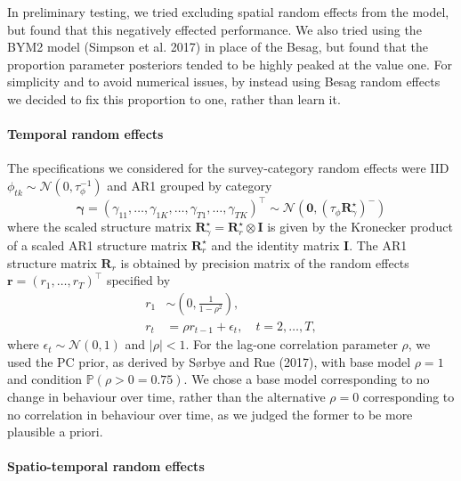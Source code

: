 \documentclass[
]{article}
\begin{document}
In preliminary testing, we tried excluding spatial random effects from
the model, but found that this negatively effected performance. We also
tried using the BYM2 model (Simpson et al. 2017) in place of the Besag,
but found that the proportion parameter posteriors tended to be highly
peaked at the value one. For simplicity and to avoid numerical issues,
by instead using Besag random effects we decided to fix this proportion
to one, rather than learn it.

\hypertarget{temporal-random-effects}{%
\paragraph{\texorpdfstring{Temporal random effects
\label{sec:temporal-random-effects}}{Temporal random effects }}\label{temporal-random-effects}}

The specifications we considered for the survey-category random effects
were IID \(\phi_{tk} \sim \mathcal{N}(0, \tau_\phi^{-1})\) and AR1
grouped by category \[
\bm{\gamma} = (\gamma_{11}, \ldots, \gamma_{1K}, \ldots, \gamma_{T1}, \ldots, \gamma_{TK})^\top \sim \mathcal{N}(\mathbf{0}, (\tau_\phi \mathbf{R}^\star_\gamma)^{-})
\] where the scaled structure matrix
\(\mathbf{R}^\star_\gamma = \mathbf{R}^\star_r \otimes \mathbf{I}\) is
given by the Kronecker product of a scaled AR1 structure matrix
\(\mathbf{R}^\star_r\) and the identity matrix \(\mathbf{I}\). The AR1
structure matrix \(\mathbf{R}_r\) is obtained by precision matrix of the
random effects \(\mathbf{r} = (r_1, \ldots, r_T)^\top\) specified by
\begin{align}
r_1 &\sim \left( 0, \frac{1}{1 - \rho^2} \right), \\
r_t &= \rho r_{t - 1} + \epsilon_t, \quad t = 2, \ldots, T, 
\end{align} where \(\epsilon_t \sim \mathcal{N}(0, 1)\) and
\(|\rho| < 1\). For the lag-one correlation parameter \(\rho\), we used
the PC prior, as derived by Sørbye and Rue (2017), with base model
\(\rho = 1\) and condition \(\mathbb{P}(\rho > 0 = 0.75)\). We chose a
base model corresponding to no change in behaviour over time, rather
than the alternative \(\rho = 0\) corresponding to no correlation in
behaviour over time, as we judged the former to be more plausible a
priori.

\hypertarget{spatio-temporal-random-effects}{%
\paragraph{\texorpdfstring{Spatio-temporal random effects
\label{sec:spatio-temporal-random-effects}}{Spatio-temporal random effects }}\label{spatio-temporal-random-effects}}
\end{document}
